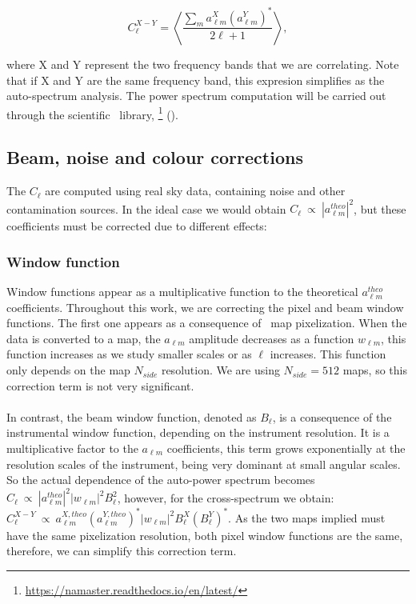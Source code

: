 \begin{equation}
    \label{eq:cl_cross}
    C_{\ell}^{X - Y} = \left < \frac{\sum_{m}^{} a_{\ell m}^{X} (a_{\ell m}^{Y})^{*} }{2\ell +1} \right >,
\end{equation}

where X and Y represent the two frequency bands that we are correlating. Note that if X and Y are the same frequency band, this expresion simplifies as the 
auto-spectrum analysis. The power spectrum computation will be carried out through the scientific \python\ library, \namaster\footnote{\url{https://namaster.readthedocs.io/en/latest/}} (\citealp{Namaster}).
\paragraph*{}

\subsection{Beam, noise and colour corrections}
\label{sec:corrections}

The $C_{\ell}$ are computed using real sky data, containing noise and other contamination sources. In the ideal case we would obtain $C_{\ell} \ \propto \ |a_{\ell m}^{theo}|^2$, but these coefficients must be corrected due to different effects:

\subsubsection{Window function}

Window functions appear as a multiplicative function to the theoretical $a_{\ell m}^{theo}$ coefficients. Throughout this work, we are correcting the pixel and beam window functions. The first one appears as a consequence of \healpix\ map pixelization. When the data is converted to a map, the $a_{\ell m}$ amplitude decreases as a function $w_{\ell m}$, this function increases as we study smaller scales or as $\ell$ increases. This function only depends on the map $N_{side}$ resolution. We are using $N_{side} = 512$ maps, so this correction term is not very significant. 
\paragraph*{}

In contrast, the beam window function, denoted as $B_{\ell}$, is a consequence of the instrumental window function, depending on the instrument resolution. It is a multiplicative factor to the $a_{\ell m}$ coefficients, this term grows exponentially at the resolution scales of the instrument, being very dominant at small angular scales. So the actual dependence of the auto-power spectrum becomes $C_{\ell} \ \propto \ |a_{\ell m}^{theo}|^2 |w_{\ell m}|^2 B_{\ell}^2$, however, for the cross-spectrum we obtain: $C_{\ell}^{X-Y} \ \propto \ a_{\ell m}^{X,theo} (a_{\ell m}^{Y,theo})^{*} |w_{\ell m}|^2 B_{\ell}^{X} (B_{\ell}^{Y})^{*}$. As the two maps implied must have the same pixelization resolution, both pixel window functions are the same, therefore, we can simplify this correction term.

